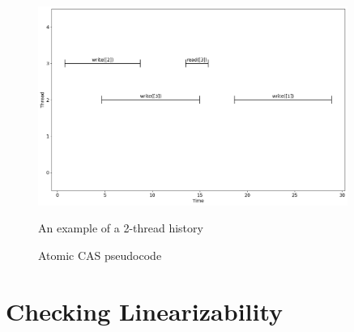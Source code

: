 \documentclass[oneside, a4paper, onecolumn, 10pt]{article}
\begin{document}
\begin{figure}[h]
  \centering
  \begin{minipage}{0.65\textwidth}
    \centering
    \includegraphics[width=0.9\textwidth]{assets/io_spec_simple.png}
    \caption{\label{Simple IO history}An example of a 2-thread history}
  \end{minipage}\hfill
  \begin{minipage}{0.3\textwidth}
    \centering
    \caption{\label{Atomic CAS} Atomic CAS pseudocode}
  \end{minipage}
\end{figure}

\section{Checking Linearizability}
\end{document}
